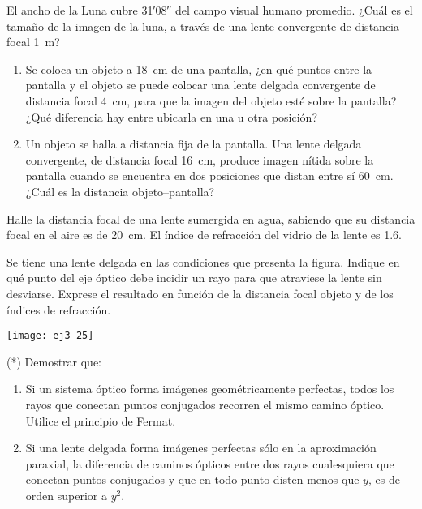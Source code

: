 \item El ancho de la Luna cubre \ang{;31;08} del campo visual humano promedio.
¿Cuál es el tamaño de la imagen de la luna, a través de una lente convergente de distancia focal \SI{1}{\metre}?



\item
\begin{enumerate}
	\item Se coloca un objeto a \SI{18}{\centi\metre} de una pantalla, ¿en qué puntos entre la pantalla y el objeto se puede colocar una lente delgada convergente de distancia focal \SI{4}{\centi\metre}, para que la imagen del objeto esté sobre la pantalla? ¿Qué diferencia hay entre ubicarla en una u otra posición?
	\item Un objeto se halla a distancia fija de la pantalla. Una lente delgada convergente, de distancia focal \SI{16}{\centi\metre}, produce imagen nítida sobre la pantalla cuando se encuentra en dos posiciones que distan entre sí \SI{60}{\centi\metre}.
¿Cuál es la distancia objeto--pantalla?
\end{enumerate}



\item Halle la distancia focal de una lente sumergida en agua, sabiendo que su distancia focal en el aire es de \SI{20}{\centi\metre}.
El índice de refracción del vidrio de la lente es \num{1.6}. 



\item
\begin{minipage}[t][2cm]{0.65\textwidth}
Se tiene una lente delgada en las condiciones que presenta la figura.
Indique en qué punto del eje óptico debe incidir un rayo para que atraviese la lente sin desviarse.
Exprese el resultado en función de la distancia focal objeto y de los índices de refracción.
\end{minipage}
\begin{minipage}[c][0.4cm][t]{0.3\textwidth}
	\texttt{[image: ej3-25]}
\end{minipage}


\item (*) Demostrar que:
\begin{enumerate}
	\item Si un sistema óptico forma imágenes geométricamente perfectas, todos los rayos que conectan puntos conjugados recorren el mismo camino óptico.
	Utilice el principio de Fermat.
	\item Si una lente delgada forma imágenes perfectas sólo en la aproximación paraxial, la diferencia de caminos ópticos entre dos rayos cualesquiera que conectan puntos conjugados y que en todo punto disten menos que $y$, es de orden superior a $y^2$.
\end{enumerate}


